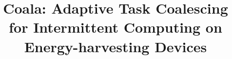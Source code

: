 \documentclass[sigplan,10pt,review,anonymous]{acmart}
\newcommand{\sys}{Coala\xspace}
\newcommand{\sysmed}{\sys: Adaptive Task Coalescing $\ldots$}
\newcommand{\sysfull}{\sys: Adaptive Task Coalescing for Intermittent Computing on Energy-harvesting Devices}
\begin{document}
\title[\sysmed]{\sysfull}









\begin{abstract}
	


\end{abstract}

\end{document}

